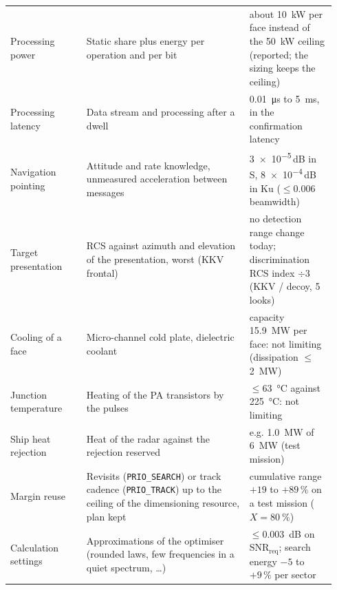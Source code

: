 \documentclass[11pt,a4paper]{article}
\newcommand{\code}[1]{\texttt{\small #1}}
\newcommand{\SNR}{\mathrm{SNR}}
\begin{document}
{\begin{longtable}{@{}p{0.22\linewidth}p{0.47\linewidth}p{0.25\linewidth}@{}}
Processing power & Static share plus energy per operation and per bit & about \SI{10}{kW} per face instead of the
\SI{50}{kW} ceiling (reported; the sizing keeps the ceiling)\\
Processing latency & Data stream and processing after a dwell & \SI{0.01}{\micro s} to \SI{5}{ms}, in the confirmation
latency\\
Navigation pointing & Attitude and rate knowledge, unmeasured acceleration between messages & \num{3e-5}\,dB in S,
\num{8e-4}\,dB in Ku ($\le 0.006$ beamwidth)\\
Target presentation & RCS against azimuth and elevation of the presentation, worst (KKV frontal) & no detection range
change today; discrimination RCS index $\div 3$ (KKV / decoy, 5 looks)\\
Cooling of a face & Micro-channel cold plate, dielectric coolant & capacity \SI{15.9}{MW} per face: not limiting
(dissipation $\le$ \SI{2}{MW})\\
Junction temperature & Heating of the PA transistors by the pulses & $\le$\SI{63}{\celsius} against \SI{225}{\celsius}:
not limiting\\
Ship heat rejection & Heat of the radar against the rejection reserved & e.g. \SI{1.0}{MW} of \SI{6}{MW} (test
mission)\\
Margin reuse & Revisits (\code{PRIO\_SEARCH}) or track cadence (\code{PRIO\_TRACK}) up to the ceiling of the dimensioning resource, plan kept & cumulative
range $+19$ to $+89\,\%$ on a test mission ($X = \SI{80}{\percent}$)\\
Calculation settings & Approximations of the optimiser (rounded laws, few frequencies in a quiet spectrum, \dots) &
$\le$\SI{0.003}{dB} on $\SNR_{\mathrm{req}}$; search energy $-5$ to $+9\,\%$ per sector\\
\bottomrule
\end{longtable}}
\end{document}
